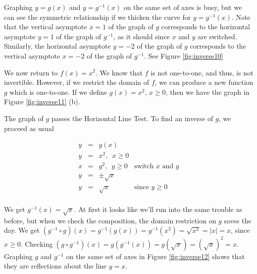 {\begin{enumerate}
Graphing $y=g(x)$ and  $y = g^{-1}(x)$ on the same set of axes is busy, but we can see the symmetric relationship if we thicken the curve for $y=g^{-1}(x)$.  Note that the vertical asymptote $x=1$ of the graph of $g$ corresponds to the horizontal asymptote $y=1$ of the graph of $g^{-1}$, as it should since $x$ and $y$ are switched.  Similarly, the horizontal asymptote $y=-2$ of the graph of $g$ corresponds to the vertical asymptote $x=-2$ of the graph of $g^{-1}$. See Figure \ref{fig:inverse10}




\end{enumerate}
}

\medskip

We now return to $f(x) = x^2$.  We know that $f$ is not one-to-one, and thus, is not invertible.  However, if we restrict the domain of $f$, we can produce a new function $g$ which is one-to-one.  If we define $g(x) = x^2$, $x \geq 0$, then we have the graph in Figure \ref{fig:inverse11} (b).


The graph of $g$ passes the Horizontal Line Test.  To find an inverse of $g$, we proceed as usual

\[ \begin{array}{rclr}
y & = & g(x) & \\
y & = & x^2, \, \, \, x \geq 0 & \\
x & = & y^2, \, \, \, y \geq 0 & \mbox{switch $x$ and $y$}\\
y & = & \pm \sqrt{x}  & \\
y & = & \sqrt{x} & \mbox{since $y \geq 0$} \\
\end{array} \]

We get $g^{-1}(x) = \sqrt{x}$.  At first it looks like we'll run into the same trouble as before, but when we check the composition, the domain restriction on $g$ saves the day.  We get  $\left(g^{-1} \circ g\right) (x) = g^{-1}(g(x)) = g^{-1}\left(x^2\right) = \sqrt{x^2} = |x| = x$, since $x \geq 0$.  Checking $\left( g \circ g^{-1}\right)(x) = g\left(g^{-1}(x)\right) = g\left(\sqrt{x}\right) = \left(\sqrt{x}\right)^2 = x$.  Graphing $g$ and $g^{-1}$ on the same set of axes in Figure \ref{fig:inverse12} shows that they are reflections about the line $y=x$.



